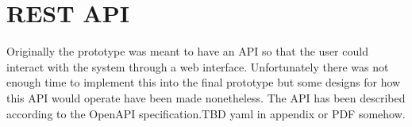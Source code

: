 \section{REST API}
Originally the prototype was meant to have an API so that the user could interact with the system through a web interface.
Unfortunately there was not enough time to implement this into the final prototype but some designs for how this API would operate have been made nonetheless.
The API has been described according to the OpenAPI specification.TBD yaml in appendix or PDF somehow.
